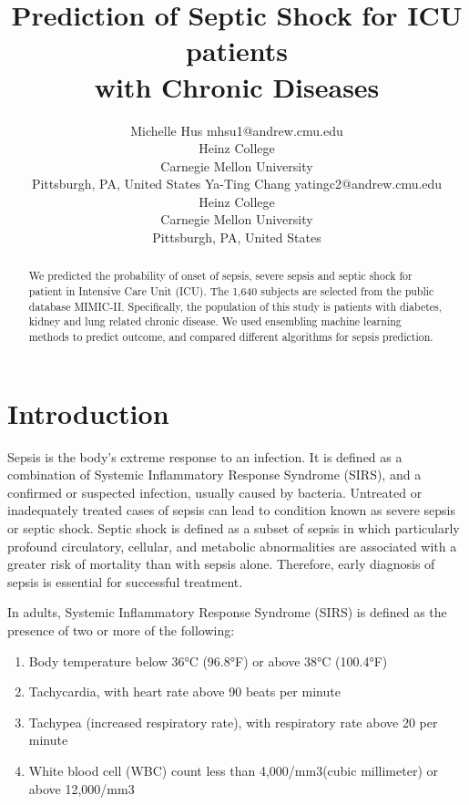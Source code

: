 \documentclass[twoside,11pt]{article}
\begin{document}
\title{Prediction of Septic Shock for ICU patients \\with Chronic Diseases}

\author{\name Michelle Hus \email mhsu1@andrew.cmu.edu \\
       \addr Heinz College\\
       Carnegie Mellon University\\
       Pittsburgh, PA, United States
       \AND
       \name Ya-Ting Chang \email yatingc2@andrew.cmu.edu\\
       \addr Heinz College\\
       Carnegie Mellon University\\
       Pittsburgh, PA, United States}

\maketitle

\begin{abstract}
	We predicted the probability of onset of sepsis, severe sepsis and septic shock for patient in Intensive Care Unit (ICU). The 1,640 subjects are selected from the public database MIMIC-II.  Specifically, the population of this study is patients with diabetes, kidney and lung related chronic disease. We used ensembling machine learning methods to predict outcome, and compared different algorithms for sepsis prediction. 
\end{abstract}
\section{Introduction}
Sepsis is the body's extreme response to an infection. It is defined as a combination of Systemic Inflammatory Response Syndrome (SIRS), and a confirmed or suspected infection, usually caused by bacteria\cite{cite2}. Untreated or inadequately treated cases of sepsis can lead to condition known as severe sepsis or septic shock. Septic shock is defined as a subset of sepsis in which particularly profound circulatory, cellular, and metabolic abnormalities are associated with a greater risk of mortality than with sepsis alone. Therefore, early diagnosis of sepsis is essential for successful treatment.

In adults, Systemic Inflammatory Response Syndrome (SIRS) is defined as the presence of two or more of the following\cite{cite1}:
\begin{enumerate}
	\item Body temperature below 36°C (96.8°F) or above 38°C (100.4°F) 
	\item Tachycardia, with heart rate above 90 beats per minute
	\item Tachypea (increased respiratory rate), with respiratory rate above 20 per minute
	\item White blood cell (WBC) count less than 4,000/mm3(cubic millimeter) or above 12,000/mm3
\end{enumerate}
\end{document}
